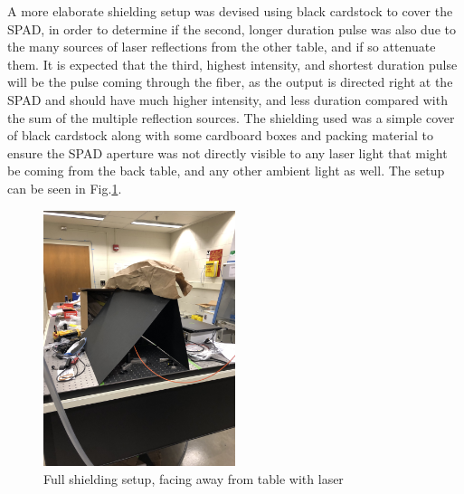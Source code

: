 \documentclass[a4paper]{article}
\begin{document}
A more elaborate shielding setup was devised using black cardstock to cover the SPAD, in order to determine if the second, longer duration pulse was also due to the many sources of laser reflections from the other table, and if so attenuate them. It is expected that the third, highest intensity, and shortest duration pulse will be the pulse coming through the fiber, as the output is directed right at the SPAD and should have much higher intensity, and less duration compared with the sum of the multiple reflection sources.
The shielding used was a simple cover of black cardstock along with some cardboard boxes and packing material to ensure the SPAD aperture was not directly visible to any laser light that might be coming from the back table, and any other ambient light as well. The setup can be seen in Fig.\ref{fig:fiber_shielded_front}.


\begin{figure}
\centering
\includegraphics[angle=270,origin=c,width=0.5\textwidth]{figures/IMG_6135.jpg}
\caption{\label{fig:fiber_shielded_front}Full shielding setup, facing away from table with laser}
\end{figure}
\end{document}
